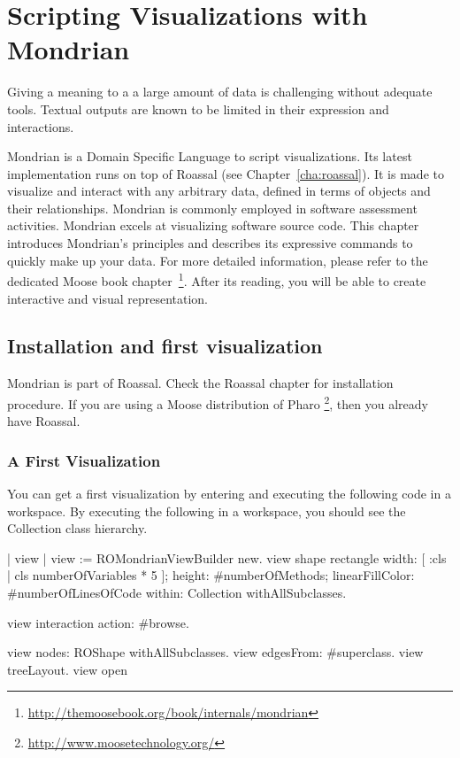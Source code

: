 \documentclass[a4paper,10pt,twoside]{book}
\begin{document}
\fi
\sloppy
\chapter{Scripting Visualizations with Mondrian}


Giving a meaning to a a large amount of data is challenging without adequate tools. Textual outputs are known to be limited in their expression and interactions. 

Mondrian is a Domain Specific Language to script visualizations. Its latest implementation runs on top of Roassal (see Chapter~\ref{cha:roassal}).  
It is made to visualize and interact with any arbitrary data, defined in terms of objects and their relationships. Mondrian is commonly employed in software assessment activities. Mondrian excels at visualizing software source code. 
This chapter introduces Mondrian's principles and describes its expressive commands to quickly make up your data. For more detailed information, please refer to the dedicated Moose book chapter~\footnote{\url{http://themoosebook.org/book/internals/mondrian}}.
After its reading, you will be able to create interactive and visual representation.


\section{Installation and first visualization}

Mondrian is part of Roassal. Check the Roassal chapter for installation procedure. If you are using a Moose distribution of Pharo \footnote{\url{http://www.moosetechnology.org/}}, then you already have Roassal. 

\subsection{A First Visualization}
You can get a first visualization by entering and executing the following code in a workspace. By executing the following in a workspace, you should see the Collection class hierarchy.

\begin{code}{}
| view |
view := ROMondrianViewBuilder new.
view shape rectangle 
	width:  [ :cls | cls numberOfVariables * 5 ];  
	height: #numberOfMethods;
	linearFillColor: #numberOfLinesOfCode within:  Collection withAllSubclasses.
		
view interaction action: #browse.

view nodes: ROShape withAllSubclasses.
view edgesFrom: #superclass.
view treeLayout.
view open
\end{code}
\end{document}
